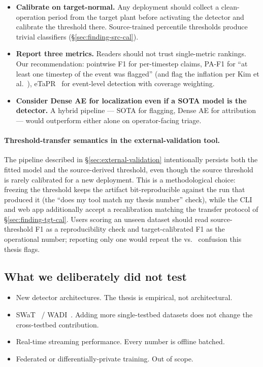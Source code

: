 \begin{itemize}
  \item \textbf{Calibrate on target-normal.}  Any deployment should collect a clean-operation period from the target plant before activating the detector and calibrate the threshold there.  Source-trained percentile thresholds produce trivial classifiers (\S\ref{sec:finding-src-cal}).
  \item \textbf{Report three metrics.}  Readers should not trust single-metric rankings.  Our recommendation: pointwise F1 for per-timestep claims, PA-F1 for ``at least one timestep of the event was flagged'' (and flag the inflation per Kim et al.~\cite{kim2022towards}), eTaPR~\cite{hwang2022etapr} for event-level detection with coverage weighting.
  \item \textbf{Consider Dense AE for localization even if a SOTA model is the detector.}  A hybrid pipeline --- SOTA for flagging, Dense AE for attribution --- would outperform either alone on operator-facing triage.
\end{itemize}

\paragraph{Threshold-transfer semantics in the external-validation tool.}
The pipeline described in \S\ref{sec:external-validation} intentionally persists both the fitted model and the source-derived threshold, even though the source threshold is rarely calibrated for a new deployment.  This is a methodological choice: freezing the threshold keeps the artifact bit-reproducible against the run that produced it (the ``does my tool match my thesis number'' check), while the CLI and web app additionally accept a  recalibration matching the transfer protocol of \S\ref{sec:finding-tgt-cal}.  Users scoring an unseen dataset should read source-threshold F1 as a reproducibility check and target-calibrated F1 as the operational number; reporting only one would repeat the  vs.\  confusion this thesis flags.

\subsection{What we deliberately did not test}

\begin{itemize}
  \item New detector architectures.  The thesis is empirical, not architectural.
  \item SWaT~\cite{goh2017swat} / WADI~\cite{ahmed2017wadi}.  Adding more single-testbed datasets does not change the cross-testbed contribution.
  \item Real-time streaming performance.  Every number is offline batched.
  \item Federated or differentially-private training.  Out of scope.
\end{itemize}

